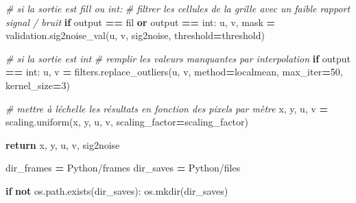 \documentclass[
]{article}
\newenvironment{Shaded}{\begin{snugshade}}{\end{snugshade}}
\newcommand{\CommentTok}[1]{\textcolor[rgb]{0.56,0.35,0.01}{\textit{#1}}}
\newcommand{\ControlFlowTok}[1]{\textcolor[rgb]{0.13,0.29,0.53}{\textbf{#1}}}
\newcommand{\DecValTok}[1]{\textcolor[rgb]{0.00,0.00,0.81}{#1}}
\newcommand{\KeywordTok}[1]{\textcolor[rgb]{0.13,0.29,0.53}{\textbf{#1}}}
\newcommand{\NormalTok}[1]{#1}
\newcommand{\OperatorTok}[1]{\textcolor[rgb]{0.81,0.36,0.00}{\textbf{#1}}}
\newcommand{\StringTok}[1]{\textcolor[rgb]{0.31,0.60,0.02}{#1}}
\begin{document}
\begin{Shaded}
\begin{Highlighting}[]
    \CommentTok{\# si la sortie est \textquotesingle{}fill\textquotesingle{} ou \textquotesingle{}int\textquotesingle{}:}
    \CommentTok{\# filtrer les cellules de la grille avec un faible rapport signal / bruit}
    \ControlFlowTok{if}\NormalTok{ output }\OperatorTok{==} \StringTok{\textquotesingle{}fil\textquotesingle{}} \KeywordTok{or}\NormalTok{  output }\OperatorTok{==} \StringTok{\textquotesingle{}int\textquotesingle{}}\NormalTok{:}
\NormalTok{        u, v, mask }\OperatorTok{=}\NormalTok{ validation.sig2noise\_val(u,}
\NormalTok{                                              v,}
\NormalTok{                                              sig2noise,}
\NormalTok{                                              threshold}\OperatorTok{=}\NormalTok{threshold)}

    \CommentTok{\# si la sortie est \textquotesingle{}int\textquotesingle{}}
    \CommentTok{\# remplir les valeurs manquantes par interpolation}
    \ControlFlowTok{if}\NormalTok{ output }\OperatorTok{==} \StringTok{\textquotesingle{}int\textquotesingle{}}\NormalTok{:}
\NormalTok{        u, v }\OperatorTok{=}\NormalTok{ filters.replace\_outliers(u,}
\NormalTok{                                        v,}
\NormalTok{                                        method}\OperatorTok{=}\StringTok{\textquotesingle{}localmean\textquotesingle{}}\NormalTok{,}
\NormalTok{                                        max\_iter}\OperatorTok{=}\DecValTok{50}\NormalTok{,}
\NormalTok{                                        kernel\_size}\OperatorTok{=}\DecValTok{3}\NormalTok{)}

    \CommentTok{\# mettre à l\textquotesingle{}échelle les résultats en fonction des pixels par mètre}
\NormalTok{    x, y, u, v }\OperatorTok{=}\NormalTok{ scaling.uniform(x,}
\NormalTok{                                 y,}
\NormalTok{                                 u,}
\NormalTok{                                 v,}
\NormalTok{                                 scaling\_factor}\OperatorTok{=}\NormalTok{scaling\_factor)}

    \ControlFlowTok{return}\NormalTok{ x, y, u, v, sig2noise}
\end{Highlighting}
\end{Shaded}

\begin{Shaded}
\begin{Highlighting}[]
\NormalTok{dir\_frames }\OperatorTok{=} \StringTok{\textquotesingle{}Python/frames\textquotesingle{}}
\NormalTok{dir\_saves }\OperatorTok{=} \StringTok{\textquotesingle{}Python/files\textquotesingle{}}

\ControlFlowTok{if} \KeywordTok{not}\NormalTok{ os.path.exists(dir\_saves):}
\NormalTok{    os.mkdir(dir\_saves)}
\end{Highlighting}
\end{Shaded}
\end{document}
